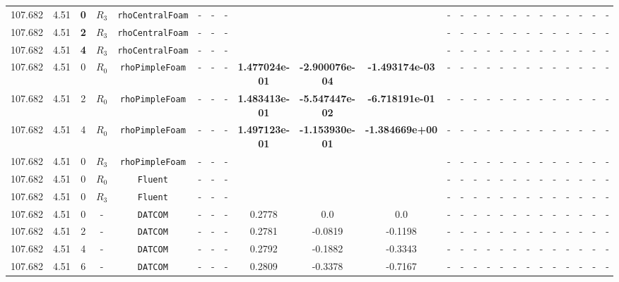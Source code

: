 \documentclass[12pt]{article}
\begin{document}
\begin{table}[H]
{\begin{tabular}{ccccc|ccc|ccc|ccc|ccc|ccccccc}
        \rowcolor{green!40}
        107.682 & 4.51 & \cellcolor{lime}\textbf{0} & \cellcolor{cyan}$R_3$ & \texttt{rhoCentralFoam} & - & - & - & \textbf{} & \textbf{} & \textbf{} & - & - & - & - & - & - & - & - & - & - & - & - & - \\
        \rowcolor{green!40}
        107.682 & 4.51 & \cellcolor{lime}\textbf{2} & \cellcolor{cyan}$R_3$ & \texttt{rhoCentralFoam} & - & - & - & \textbf{} & \textbf{} & \textbf{} & - & - & - & - & - & - & - & - & - & - & - & - & - \\
        \rowcolor{green!40}
        107.682 & 4.51 & \cellcolor{lime}\textbf{4} & \cellcolor{cyan}$R_3$ & \texttt{rhoCentralFoam} & - & - & - & \textcolor{red}{\textbf{}} & \textcolor{red}{\textbf{}} & \textcolor{red}{\textbf{}} & - & - & - & - & - & - & - & - & - & - & - & - & - \\
        \rowcolor{blue!10}
        107.682 & 4.51 & 0 & $R_0$ & \texttt{rhoPimpleFoam} & - & - & - & \textbf{1.477024e-01} & \textbf{-2.900076e-04} & \textbf{-1.493174e-03} & - & - & - & - & - & - & - & - & - & - & - & - & - \\ 
        \rowcolor{blue!10}
        107.682 & 4.51 & 2 & $R_0$ & \texttt{rhoPimpleFoam} & - & - & - & \textbf{1.483413e-01} & \textbf{-5.547447e-02} & \textbf{-6.718191e-01} & - & - & - & - & - & - & - & - & - & - & - & - & - \\
        \rowcolor{blue!10}
        107.682 & 4.51 & 4 & $R_0$ & \texttt{rhoPimpleFoam} & - & - & - & \textbf{1.497123e-01} & \textbf{-1.153930e-01} & \textbf{-1.384669e+00} & - & - & - & - & - & - & - & - & - & - & - & - & - \\
        \rowcolor{blue!40}
        107.682 & 4.51 & 0 & $R_3$ & \texttt{rhoPimpleFoam} & - & - & - &  & &  & - & - & - & - & - & - & - & - & - & - & - & - & - \\
        \rowcolor{red!10}
        107.682 & 4.51 & 0 & $R_0$ & \texttt{Fluent} & - & - & - &  &  &  & - & - & - & - & - & - & - & - & - & - & - & - & - \\ 
        \rowcolor{red!40}
        107.682 & 4.51 & 0 & $R_3$ & \texttt{Fluent} & - & - & - &  &  &  & - & - & - & - & - & - & - & - & - & - & - & - & - \\ 
        \rowcolor{gray!10}
        107.682 & 4.51 & 0 & - & \texttt{DATCOM} & - & - & - & 0.2778 & 0.0 & 0.0 & - & - & - & - & - & - & - & - & - & - & - & - & - \\ 
        \rowcolor{gray!10}
        107.682 & 4.51 & 2 & - & \texttt{DATCOM} & - & - & - & 0.2781 & -0.0819 & -0.1198 & - & - & - & - & - & - & - & - & - & - & - & - & - \\ 
        \rowcolor{gray!10}
        107.682 & 4.51 & 4 & - & \texttt{DATCOM} & - & - & - & 0.2792 & -0.1882 & -0.3343 & - & - & - & - & - & - & - & - & - & - & - & - & - \\ 
        \rowcolor{gray!10}
        107.682 & 4.51 & 6 & - & \texttt{DATCOM} & - & - & - & 0.2809 & -0.3378 & -0.7167 & - & - & - & - & - & - & - & - & - & - & - & - & - \\
        \hline 
        \hline 
    \end{tabular}}
\end{table}
\end{document}

